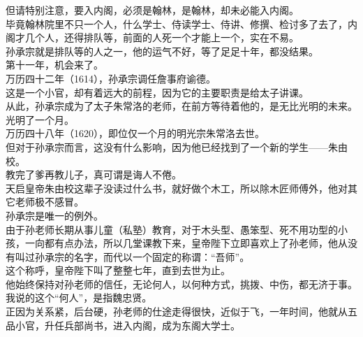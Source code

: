 \begin{multicols}{\theparacolNo}
但请特别注意，要入内阁，必须是翰林，是翰林，却未必能入内阁。\\

毕竟翰林院里不只一个人，什么学士、侍读学士、侍讲、修撰、检讨多了去了，内阁才几个人，还得排队等，前面的人死一个才能上一个，实在不易。\\

孙承宗就是排队等的人之一，他的运气不好，等了足足十年，都没结果。\\

第十一年，机会来了。\\

万历四十二年（1614），孙承宗调任詹事府谕德。\\

这是一个小官，却有着远大的前程，因为它的主要职责是给太子讲课。\\

从此，孙承宗成为了太子朱常洛的老师，在前方等待着他的，是无比光明的未来。\\

光明了一个月。\\

万历四十八年（1620），即位仅一个月的明光宗朱常洛去世。\\

但对于孙承宗而言，这没有什么影响，因为他已经找到了一个新的学生——朱由校。\\

教完了爹再教儿子，真可谓是诲人不倦。\\

天启皇帝朱由校这辈子没读过什么书，就好做个木工，所以除木匠师傅外，他对其它老师极不感冒。\\

孙承宗是唯一的例外。\\

由于孙老师长期从事儿童（私塾）教育，对于木头型、愚笨型、死不用功型的小孩，一向都有点办法，所以几堂课教下来，皇帝陛下立即喜欢上了孙老师，他从没有叫过孙承宗的名字，而代以一个固定的称谓：“吾师”。\\

这个称呼，皇帝陛下叫了整整七年，直到去世为止。\\

他始终保持对孙老师的信任，无论何人，以何种方式，挑拨、中伤，都无济于事。\\

我说的这个“何人”，是指魏忠贤。\\

正因为关系紧，后台硬，孙老师的仕途走得很快，近似于飞，一年时间，他就从五品小官，升任兵部尚书，进入内阁，成为东阁大学士。\\


\end{multicols}
